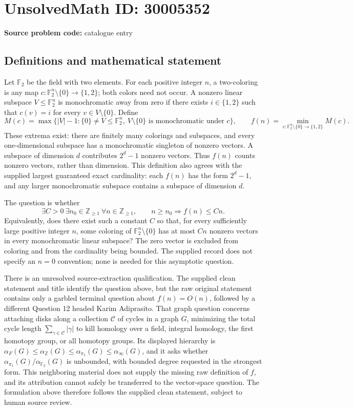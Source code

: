 \documentclass[11pt]{article}
\newcommand{\Z}{\mathbb{Z}}
\newcommand{\F}{\mathbb{F}}
\begin{document}
\section*{UnsolvedMath ID: 30005352}
\textbf{Source problem code:} catalogue entry
\subsection{Definitions and mathematical statement}
Let \(\F_2\) be the field with two elements. For each positive integer \(n\), a two-coloring is any map \(c:\F_2^n\setminus\{0\}\to\{1,2\}\); both colors need not occur. A nonzero linear subspace \(V\leq\F_2^n\) is monochromatic away from zero if there exists \(i\in\{1,2\}\) such that \(c(v)=i\) for every \(v\in V\setminus\{0\}\). Define
\[
M(c)=\max\bigl\{|V|-1: \{0\}\ne V\leq\F_2^n,\ V\setminus\{0\}\text{ is monochromatic under }c\bigr\},
\qquad
f(n)=\min_{c:\F_2^n\setminus\{0\}\to\{1,2\}}M(c).
\]
These extrema exist: there are finitely many colorings and subspaces, and every one-dimensional subspace has a monochromatic singleton of nonzero vectors. A subspace of dimension \(d\) contributes \(2^d-1\) nonzero vectors. Thus \(f(n)\) counts nonzero vectors, rather than dimension. This definition also agrees with the supplied largest guaranteed exact cardinality: each \(f(n)\) has the form \(2^d-1\), and any larger monochromatic subspace contains a subspace of dimension \(d\).

The question is whether
\[
\exists C>0\ \exists n_0\in\Z_{\geq1}\ \forall n\in\Z_{\geq1},\qquad n\geq n_0\Longrightarrow f(n)\leq Cn.
\]
Equivalently, does there exist such a constant \(C\) so that, for every sufficiently large positive integer \(n\), some coloring of \(\F_2^n\setminus\{0\}\) has at most \(Cn\) nonzero vectors in every monochromatic linear subspace? The zero vector is excluded from coloring and from the cardinality being bounded. The supplied record does not specify an \(n=0\) convention; none is needed for this asymptotic question.

There is an unresolved source-extraction qualification. The supplied clean statement and title identify the question above, but the raw original statement contains only a garbled terminal question about \(f(n)=O(n)\), followed by a different Question 12 headed Karim Adiprasito. That graph question concerns attaching disks along a collection \(\mathcal C\) of cycles in a graph \(G\), minimizing the total cycle length \(\sum_{\gamma\in\mathcal C}|\gamma|\) to kill homology over a field, integral homology, the first homotopy group, or all homotopy groups. Its displayed hierarchy is \(\alpha_F(G)\leq\alpha_{\Z}(G)\leq\alpha_{\pi_1}(G)\leq\alpha_{\infty}(G)\), and it asks whether \(\alpha_{\pi_1}(G)/\alpha_{\F_2}(G)\) is unbounded, with bounded degree requested in the strongest form. This neighboring material does not supply the missing raw definition of \(f\), and its attribution cannot safely be transferred to the vector-space question. The formulation above therefore follows the supplied clean statement, subject to human source review.
\end{document}
